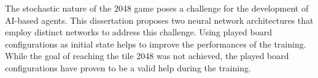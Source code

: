 The stochastic nature of the 2048 game poses a challenge for the development of AI-based agents. This dissertation proposes two neural network architectures that employ distinct networks to address this challenge. Using played board configurations as initial state helps to improve the performances of the training. While the goal of reaching the tile 2048 was not achieved, the played board configurations have proven to be a valid help during the training.